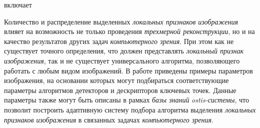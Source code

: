 \begin{SCn}
\begin{scnrelfromset}{включает}
\begin{scnindent}
            \begin{scnindent}
                \begin{scnindent}
                \end{scnindent}
                \begin{scnindent}
                \end{scnindent}
            \end{scnindent}
            \begin{scnindent}
            \end{scnindent}
        \end{scnindent}
    \end{scnrelfromset}
\end{SCn}

Количество и распределение выделенных \textit{локальных признаков изображения} влияет на возможность не только проведения \textit{трехмерной реконструкции}, но и на качество результатов других задач \textit{компьютерного зрения}. При этом как не существует точного определения, что должен представлять \textit{локальный признак изображения}, так и не существует универсального алгоритма, позволяющего работать с любым видом изображений. В работе  приведены примеры параметров изображения, на основании которых могут подбираться соответствующие параметры алгоритмов детекторов и дескрипторов ключевых точек. Данные параметры также могут быть описаны в рамках \textit{базы знаний} \textit{ostis-системы}, что позволит построить адаптивную систему подбора алгоритма выделения \textit{локальных признаков изображения} в связанных задачах \textit{компьютерного зрения}.

